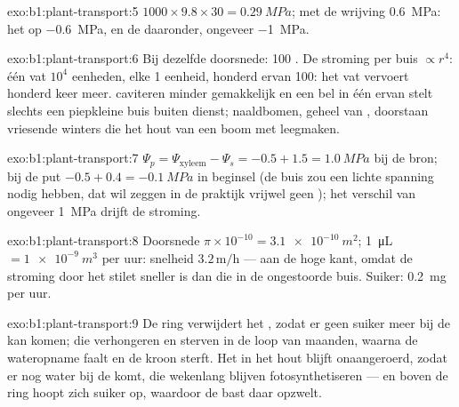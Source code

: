 \begin{solution}{exo:b1:plant-transport:5}
$1000\times 9.8\times 30 = \qty{0.29}{MPa}$; met de wrijving
\qty{0.6}{MPa}: het  op \qty{-0.6}{MPa}, en de  daaronder,
ongeveer \qty{-1}{MPa}.
\end{solution}

\begin{solution}{exo:b1:plant-transport:6}
Bij dezelfde doorsnede: 100 . De stroming per buis $\propto r^4$:
één vat $10^4$ eenheden, elke  1 eenheid, honderd ervan 100: het
vat vervoert honderd keer meer.  caviteren minder gemakkelijk en
een bel in één ervan stelt slechts een piepkleine buis buiten dienst;
naaldbomen, geheel van , doorstaan vriesende winters die het hout
van een boom met  leegmaken.
\end{solution}

\begin{solution}{exo:b1:plant-transport:7}
$\Psi_p = \Psi_{\text{xyleem}} - \Psi_s = -0.5 + 1.5 = \qty{1.0}{MPa}$
bij de bron; bij de put $-0.5 + 0.4 = \qty{-0.1}{MPa}$ in beginsel (de buis
zou een lichte spanning nodig hebben, dat wil zeggen in de praktijk vrijwel
geen ); het verschil van ongeveer \qty{1}{MPa} drijft de stroming.
\end{solution}

\begin{solution}{exo:b1:plant-transport:8}
Doorsnede $\pi\times 10^{-10} = \qty{3.1e-10}{m^2}$; \qty{1}{\micro L}
$= \qty{1e-9}{m^3}$ per uur: snelheid $3.2\,\mathrm{m/h}$ --- aan de hoge
kant, omdat de stroming door het stilet sneller is dan die in de
ongestoorde buis. Suiker: \qty{0.2}{mg} per uur.
\end{solution}

\begin{solution}{exo:b1:plant-transport:9}
De ring verwijdert het , zodat er geen suiker meer bij de  kan
komen; die verhongeren en sterven in de loop van maanden, waarna de
wateropname faalt en de kroon sterft. Het  in het hout blijft
onaangeroerd, zodat er nog water bij de  komt, die wekenlang blijven
fotosynthetiseren --- en boven de ring hoopt zich suiker op, waardoor de
bast daar opzwelt.
\end{solution}

